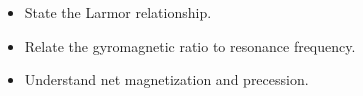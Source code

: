 \begin{objectives}
\begin{itemize}[leftmargin=1.4em,itemsep=2pt]
\item State the Larmor relationship.
\item Relate the gyromagnetic ratio to resonance frequency.
\item Understand net magnetization and precession.
\end{itemize}
\end{objectives}
